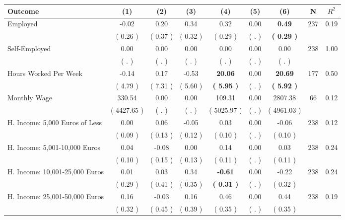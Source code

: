\begin{tabular}{lcccccccc}
\toprule
 \textbf{Outcome} & \textbf{(1)} & \textbf{(2)} & \textbf{(3)} & \textbf{(4)} & \textbf{(5)} & \textbf{(6)} & \textbf{N} & \textbf{$ R^2$} \\
\midrule
Employed &     -0.02 &      0.20 &      0.34 &      0.32 &      0.00 & \textbf{     0.49} & 237 &       0.19 \\ 
 & (     0.26 ) & (     0.37 ) & (     0.32 ) & (     0.29 ) & (        . ) & \textbf{(     0.29 )} & \\
Self-Employed &      0.00 &      0.00 &      0.00 &      0.00 &      0.00 &      0.00 & 238 &       1.00 \\ 
 & (        . ) & (        . ) & (        . ) & (        . ) & (        . ) & (        . ) & \\
Hours Worked Per Week &     -0.14 &      0.17 &     -0.53 & \textbf{    20.06} &      0.00 & \textbf{    20.69} & 177 &       0.50 \\ 
 & (     4.79 ) & (     7.31 ) & (     5.60 ) & \textbf{(     5.95 )} & (        . ) & \textbf{(     5.92 )} & \\
Monthly Wage &    330.54 &      0.00 &      0.00 &    109.31 &      0.00 &   2807.38 & 66 &       0.12 \\ 
 & (  4427.65 ) & (        . ) & (        . ) & (  5025.97 ) & (        . ) & (  4961.03 ) & \\
H. Income: 5,000 Euros of Less &      0.00 &      0.06 &     -0.05 &      0.03 &      0.00 &     -0.06 & 238 &       0.12 \\ 
 & (     0.09 ) & (     0.13 ) & (     0.12 ) & (     0.10 ) & (        . ) & (     0.10 ) & \\
H. Income: 5,001-10,000 Euros &      0.04 &     -0.08 &      0.00 &      0.14 &      0.00 &      0.03 & 238 &       0.24 \\ 
 & (     0.10 ) & (     0.15 ) & (     0.13 ) & (     0.11 ) & (        . ) & (     0.11 ) & \\
H. Income: 10,001-25,000 Euros &      0.01 &      0.03 &      0.34 & \textbf{    -0.61} &      0.00 &     -0.22 & 238 &       0.24 \\ 
 & (     0.29 ) & (     0.41 ) & (     0.35 ) & \textbf{(     0.31 )} & (        . ) & (     0.32 ) & \\
H. Income: 25,001-50,000 Euros &      0.16 &     -0.03 &      0.16 &      0.46 &      0.00 &      0.44 & 238 &       0.19 \\ 
 & (     0.32 ) & (     0.45 ) & (     0.39 ) & (     0.35 ) & (        . ) & (     0.35 ) & \\

\end{tabular}
